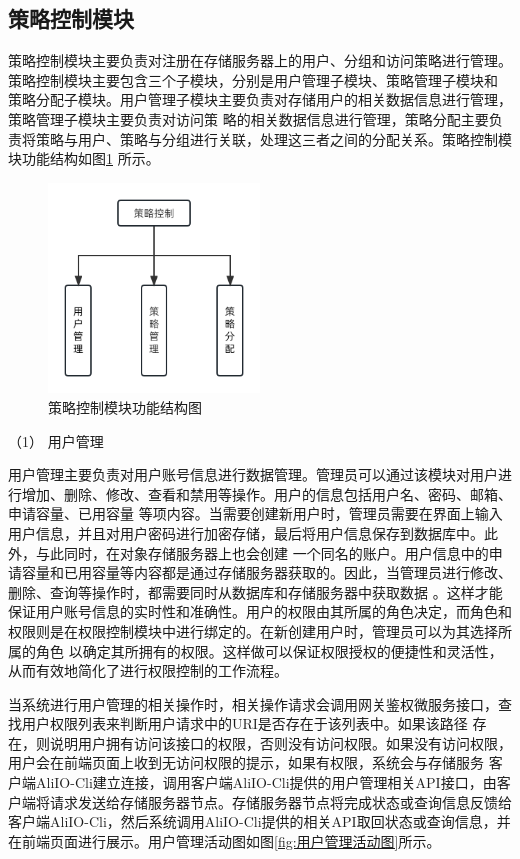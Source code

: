 \subsection{策略控制模块}

策略控制模块主要负责对注册在存储服务器上的用户、分组和访问策略进行管理。策略控制模块主要包含三个子模块，分别是用户管理子模块、策略管理子模块和
策略分配子模块。用户管理子模块主要负责对存储用户的相关数据信息进行管理，策略管理子模块主要负责对访问策
略的相关数据信息进行管理，策略分配主要负责将策略与用户、策略与分组进行关联，处理这三者之间的分配关系。策略控制模块功能结构如图\ref{fig:策略控制模块功能结构图}
所示。

\begin{figure}[htb]
    \centering
    \includegraphics[width=0.5\textwidth]{my_figures/chapter4/策略控制模块功能结构图.png}
    \caption{策略控制模块功能结构图}
    \label{fig:策略控制模块功能结构图}
\end{figure}

（1） 用户管理

用户管理主要负责对用户账号信息进行数据管理。管理员可以通过该模块对用户进行增加、删除、修改、查看和禁用等操作。用户的信息包括用户名、密码、邮箱、申请容量、已用容量
等项内容。当需要创建新用户时，管理员需要在界面上输入用户信息，并且对用户密码进行加密存储，最后将用户信息保存到数据库中。此外，与此同时，在对象存储服务器上也会创建
一个同名的账户。用户信息中的申请容量和已用容量等内容都是通过存储服务器获取的。因此，当管理员进行修改、删除、查询等操作时，都需要同时从数据库和存储服务器中获取数据
。这样才能保证用户账号信息的实时性和准确性。用户的权限由其所属的角色决定，而角色和权限则是在权限控制模块中进行绑定的。在新创建用户时，管理员可以为其选择所属的角色
以确定其所拥有的权限。这样做可以保证权限授权的便捷性和灵活性，从而有效地简化了进行权限控制的工作流程。

当系统进行用户管理的相关操作时，相关操作请求会调用网关鉴权微服务接口，查找用户权限列表来判断用户请求中的URI是否存在于该列表中。如果该路径
存在，则说明用户拥有访问该接口的权限，否则没有访问权限。如果没有访问权限，用户会在前端页面上收到无访问权限的提示，如果有权限，系统会与存储服务
客户端AliIO-Cli建立连接，调用客户端AliIO-Cli提供的用户管理相关API接口，由客户端将请求发送给存储服务器节点。存储服务器节点将完成状态或查询信息反馈给
客户端AliIO-Cli，然后系统调用AliIO-Cli提供的相关API取回状态或查询信息，并在前端页面进行展示。用户管理活动图如图\ref{fig:用户管理活动图}所示。

